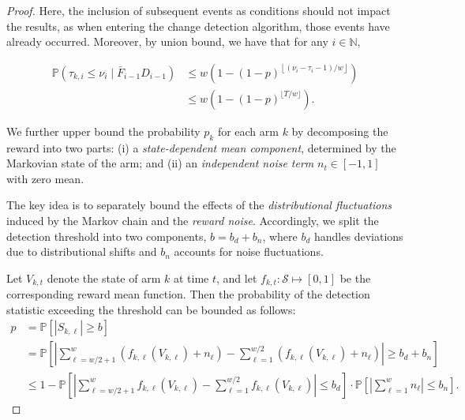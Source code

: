 \documentclass[twoside]{article}
\theoremstyle{plain}
\theoremstyle{definition}
\theoremstyle{remark}
\begin{document}
\begin{proof}
Here, the inclusion of subsequent events as conditions should not impact the results, as when entering the change detection algorithm, those events have already occurred. Moreover, by union bound, we have that for any $i \in \mathbb{N}$,

\begin{subequations}
    \begin{align}
        \mathbb{P}\left(\tau_{k,i} \leq \nu_i \mid \bar{F}_{i-1} D_{i-1}\right) 
        & \leq w\left(1-(1-p)^{\left\lfloor\left(\nu_i-\tau_i-1\right) / w\right\rfloor}\right)\\
        & \leq w\left(1-(1-p)^{\lfloor T / w\rfloor}\right).
    \end{align}    
\end{subequations}


We further upper bound the probability \( p_k \) for each arm \( k \) by decomposing 
the reward into two parts:  
(i) a \emph{state-dependent mean component}, determined by the Markovian state of the arm; and  
(ii) an \emph{independent noise term} \( n_{t} \in [-1,1] \) with zero mean. 

The key idea is to separately bound the effects of the \emph{distributional fluctuations} 
induced by the Markov chain and the \emph{reward noise}.  
Accordingly, we split the detection threshold into two components, \( b = b_d + b_n \), 
where \( b_d \) handles deviations due to distributional shifts and \( b_n \) accounts for noise fluctuations. 

Let \( V_{k,t} \) denote the state of arm \( k \) at time \( t \), and let 
\( f_{k,t}: \mathcal{S} \mapsto [0,1] \) be the corresponding reward mean function.  
Then the probability of the detection statistic exceeding the threshold can be bounded as follows:
\begin{subequations}
    \begin{align}
        p
        &= \mathbb{P}\left[\left\lvert S_{k,\ell}\right\rvert \geq b \right]\label{eqn:p1}\\
        &= \mathbb{P}\left[\left\lvert 
        \sum_{\ell = w/2+1}^{w} \left(f_{k,\ell}\left(V_{k,\ell}\right) + n_{\ell}\right)
        - \sum_{\ell = 1}^{w/2} \left(f_{k,\ell}\left(V_{k,\ell}\right) + n_{\ell}\right)
        \right\rvert \geq b_d + b_n \right] \label{eqn:p2}\\
        &\leq 1 - 
        \mathbb{P}\left[\left\lvert 
        \sum_{\ell = w/2+1}^{w} f_{k,\ell}(V_{k,\ell}) 
        - \sum_{\ell = 1}^{w/2} f_{k,\ell}(V_{k,\ell})
        \right\rvert \leq b_d \right]
        \cdot
        \mathbb{P}\left[\left\lvert 
        \sum_{\ell = 1}^{w} n_{\ell} 
        \right\rvert \leq b_n \right]. \label{eqn:p}
    \end{align}
\end{subequations}


\end{proof}
\end{document}
